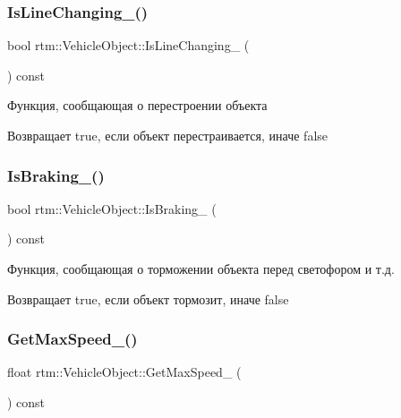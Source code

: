 \subsubsection{\texorpdfstring{Is\+Line\+Changing\+\_\+()}{IsLineChanging\_()}}
{\footnotesize\ttfamily bool rtm\+::\+Vehicle\+Object\+::\+Is\+Line\+Changing\+\_\+ (\begin{DoxyParamCaption}{ }\end{DoxyParamCaption}) const\hspace{0.3cm}{\ttfamily [protected]}}



Функция, сообщающая о перестроении объекта 

\begin{DoxyReturn}{Возвращает}
true, если объект перестраивается, иначе false 
\end{DoxyReturn}
\mbox{\label{classrtm_1_1_vehicle_object_ab74eb10fd7df8238a437923cbf184bca}} 
\subsubsection{\texorpdfstring{Is\+Braking\+\_\+()}{IsBraking\_()}}
{\footnotesize\ttfamily bool rtm\+::\+Vehicle\+Object\+::\+Is\+Braking\+\_\+ (\begin{DoxyParamCaption}{ }\end{DoxyParamCaption}) const\hspace{0.3cm}{\ttfamily [protected]}}



Функция, сообщающая о торможении объекта перед светофором и т.\+д. 

\begin{DoxyReturn}{Возвращает}
true, если объект тормозит, иначе false 
\end{DoxyReturn}
\mbox{\label{classrtm_1_1_vehicle_object_ad0dd345b8c1d7913034aaf3267ee4a03}} 
\subsubsection{\texorpdfstring{Get\+Max\+Speed\+\_\+()}{GetMaxSpeed\_()}}
{\footnotesize\ttfamily float rtm\+::\+Vehicle\+Object\+::\+Get\+Max\+Speed\+\_\+ (\begin{DoxyParamCaption}{ }\end{DoxyParamCaption}) const\hspace{0.3cm}{\ttfamily [protected]}}



